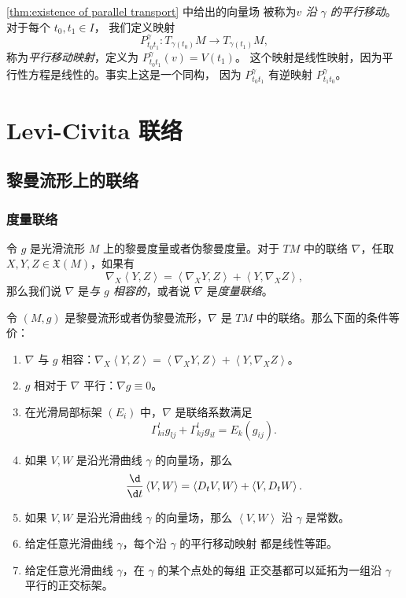 \documentclass[fontset=none]{Notes}
\newcommand{\inn}[1]{\left\langle #1\right\rangle}
\begin{document}
\autoref{thm:existence of parallel transport} 中给出的向量场
被称为\emph{$v$ 沿 $\gamma$ 的平行移动}。对于每个 $t_0,t_1\in I$，
我们定义映射
\begin{equation}
  P_{t_0t_1}^\gamma:T_{\gamma(t_0)}M\to T_{\gamma(t_1)}M,
\end{equation}
称为\emph{平行移动映射}，定义为 $P_{t_0t_1}^\gamma(v)=V(t_1)$。
这个映射是线性映射，因为平行性方程是线性的。事实上这是一个同构，
因为 $P_{t_0t_1}^\gamma$ 有逆映射 $P_{t_1t_0}^\gamma$。


\chapter{Levi-Civita 联络}

\section{黎曼流形上的联络}

\subsection{度量联络}

令 $g$ 是光滑流形 $M$ 上的黎曼度量或者伪黎曼度量。对于 $TM$ 中的联络
$\nabla$，任取 $X,Y,Z\in \mathfrak{X}(M)$，如果有
\begin{equation}
  \nabla_X\inn{Y,Z}=\inn{\nabla_XY,Z}+\inn{Y,\nabla_XZ},
\end{equation}
那么我们说 $\nabla$ 是\emph{与 $g$ 相容的}，或者说 $\nabla$ 是\emph{度量联络}。

\begin{proposition}[度量联络的特征]
  令 $(M,g)$ 是黎曼流形或者伪黎曼流形，$\nabla$ 是 $TM$ 中的联络。那么下面的条件等价：
  \begin{enumerate}
    \item $\nabla$ 与 $g$ 相容：$\nabla_X\inn{Y,Z}=\inn{\nabla_XY,Z}+\inn{Y,\nabla_XZ}$。
    \item $g$ 相对于 $\nabla$ 平行：$\nabla g\equiv 0$。
    \item 在光滑局部标架 $(E_i)$ 中，$\nabla $ 是联络系数满足
    \begin{equation}
      \Gamma_{ki}^lg_{lj}+\Gamma_{kj}^lg_{il}=E_k(g_{ij}).
    \end{equation}
    \item 如果 $V,W$ 是沿光滑曲线 $\gamma$ 的向量场，那么
    \begin{equation}
      \frac{\d}{\d t}\inn{V,W}=\inn{D_tV,W}+\inn{V,D_tW}.
    \end{equation}
    \item 如果 $V,W$ 是沿光滑曲线 $\gamma$ 的向量场，那么 $\inn{V,W}$
    沿 $\gamma$ 是常数。
    \item 给定任意光滑曲线 $\gamma$，每个沿 $\gamma$ 的平行移动映射
    都是线性等距。
    \item 给定任意光滑曲线 $\gamma$，在 $\gamma$ 的某个点处的每组
    正交基都可以延拓为一组沿 $\gamma$ 平行的正交标架。
  \end{enumerate}
\end{proposition}
\end{document}
